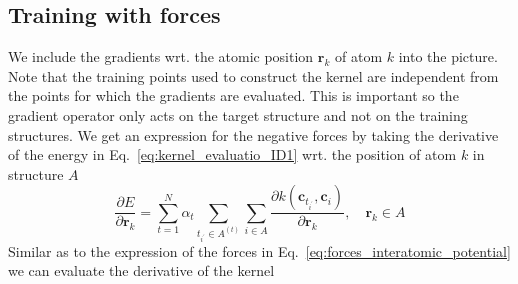 \subsection{Training with forces}
We include the gradients wrt. the atomic position $\mathbf{r}_k$ of atom $k$ into the picture.
Note that the training points used to construct the kernel are independent from the points for which the gradients are evaluated.
This is important so the gradient operator only acts on the target structure and not on the training structures.
We get an expression for the negative forces by taking the derivative of the energy in Eq.~\eqref{eq:kernel_evaluatio_ID1} wrt. the position of atom $k$ in structure $A$
\begin{equation}
  \label{eq:kernel_evaluation_gradients}
  \frac{\partial E}{\partial\mathbf{r}_k} = \sum_{t=1}^N \alpha_t \sum_{t_{i^\prime}\in A^{(t)}}\sum_{i\in A} \frac{\partial k(\mathbf{c}_{t_{i^\prime}}, \mathbf{c}_{i})}{\partial\mathbf{r}_k},\quad\mathbf{r}_k\in A
\end{equation}
Similar as to the expression of the forces in Eq.~\eqref{eq:forces_interatomic_potential} we can evaluate the derivative of the kernel
